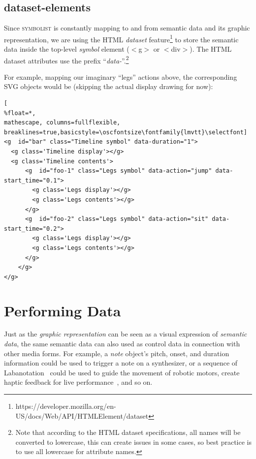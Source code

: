 \documentclass{article}
\def\symbolist{\textsc{symbolist}\xspace}
\def\oscfontsize{\footnotesize}
\begin{document}
\subsection{dataset-elements}\label{sec:dataset}

Since \symbolist is constantly mapping to and from semantic data and its graphic representation, we are using the HTML \textit{dataset} feature\footnote{https://developer.mozilla.org/en-US/docs/Web/API/HTMLElement/dataset} to store the semantic data inside the top-level \textit{symbol} element ($<$g$>$ or $<$div$>$).
The HTML dataset attributes use the prefix ``\textit{data-}''.\footnote{Note that according to the HTML dataset specifications, all names will be converted to lowercase, this can create issues in some cases, so best practice is to use all lowercase for attribute names.}

For example, mapping our imaginary ``legs'' actions above, the corresponding SVG objects would be (skipping the actual display drawing for now):

\begin{minipage}{\linewidth}
\begin{lstlisting}[
%float=*,
mathescape, columns=fullflexible, breaklines=true,basicstyle=\oscfontsize\fontfamily{lmvtt}\selectfont]
<g  id="bar" class="Timeline symbol" data-duration="1">
  <g class='Timeline display'></g>
  <g class='Timeline contents'>
      <g  id="foo-1" class="Legs symbol" data-action="jump" data-start_time="0.1">
        <g class='Legs display'></g>
        <g class='Legs contents'></g>
      </g>
      <g  id="foo-2" class="Legs symbol" data-action="sit" data-start_time="0.2">
        <g class='Legs display'></g>
        <g class='Legs contents'></g>
      </g>
    </g>
</g>
\end{lstlisting}
\end{minipage}




\section{Performing Data}

Just as the \textit{graphic representation} can be seen as a visual expression of \textit{semantic data}, the same semantic data can also used as control data in connection with other media forms. For example, a \textit{note} object's pitch, onset, and duration information could be used to trigger a note on a synthesizer, or a sequence of Labanotation~\cite{guest2014labanotation} could be used to guide the movement of robotic motors, create haptic feedback for live performance~\cite{west2019design}, and so on. 
\end{document}

